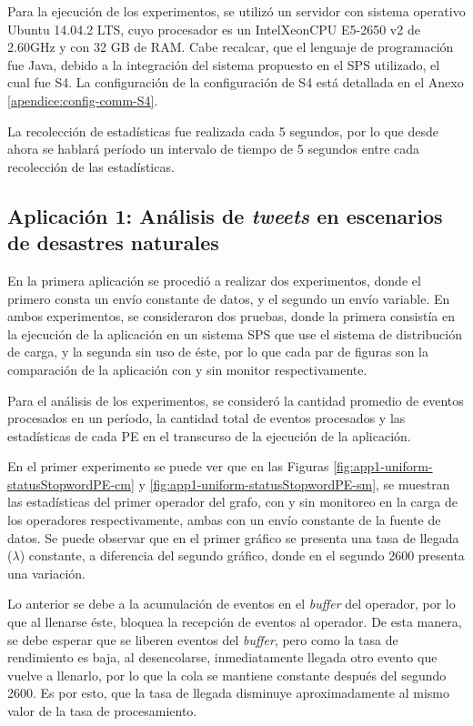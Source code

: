 Para la ejecución de los experimentos, se utilizó un servidor con sistema operativo Ubuntu 14.04.2 LTS, cuyo procesador es un Intel\textregistered Xeon\textregistered CPU E5-2650 v2 de 2.60GHz y con 32 GB de RAM. Cabe recalcar, que el lenguaje de programación fue Java, debido a la integración del sistema propuesto en el SPS utilizado, el cual fue S4. La configuración de la configuración de S4 está detallada en el Anexo \ref{apendice:config-comm-S4}.

La recolección de estadísticas fue realizada cada 5 segundos, por lo que desde ahora se hablará período un intervalo de tiempo de 5 segundos entre cada recolección de las estadísticas.

\subsection{Aplicación 1: Análisis de \textit{tweets} en escenarios de desastres naturales}
En la primera aplicación se procedió a realizar dos experimentos, donde el primero consta un envío constante de datos, y el segundo un envío variable. En ambos experimentos, se consideraron dos pruebas, donde la primera consistía en la ejecución de la aplicación en un sistema SPS que use el sistema de distribución de carga, y la segunda sin uso de éste, por lo que cada par de figuras son la comparación de la aplicación con y sin monitor respectivamente.

Para el análisis de los experimentos, se consideró la cantidad promedio de eventos procesados en un período, la cantidad total de eventos procesados y las estadísticas de cada PE en el transcurso de la ejecución de la aplicación.

En el primer experimento se puede ver que en las Figuras \ref{fig:app1-uniform-statusStopwordPE-cm} y \ref{fig:app1-uniform-statusStopwordPE-sm}, se muestran las estadísticas del primer operador del grafo, con y sin monitoreo en la carga de los operadores respectivamente, ambas con un envío constante de la fuente de datos. Se puede observar que en el primer gráfico se presenta una tasa de llegada ($\lambda$) constante, a diferencia del segundo gráfico, donde en el segundo 2600 presenta una variación.

Lo anterior se debe a la acumulación de eventos en el \textit{buffer} del operador, por lo que al llenarse éste, bloquea la recepción de eventos al operador. De esta manera, se debe esperar que se liberen eventos del \textit{buffer}, pero como la tasa de rendimiento es baja, al desencolarse, inmediatamente llegada otro evento que vuelve a llenarlo, por lo que la cola se mantiene constante después del segundo 2600. Es por esto, que la tasa de llegada disminuye aproximadamente al mismo valor de la tasa de procesamiento.

